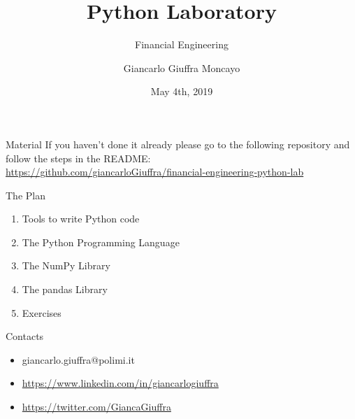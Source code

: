 \documentclass{beamer}
\title{Python Laboratory}
\subtitle{Financial Engineering}
\date{May 4th, 2019}
\author{Giancarlo Giuffra Moncayo}
\institute{Politecnico di Milano}
\begin{document}
  \maketitle

  \begin{frame}{Material}
   If you haven't done it already please go to the following repository and follow the steps in the README:\\
   \vspace{1cm}
   \footnotesize{\url{https://github.com/giancarloGiuffra/financial-engineering-python-lab}}
  \end{frame}
  
  \begin{frame}{The Plan}
   \begin{enumerate}
   \item<1-> Tools to write Python code
   \item<2-> The Python Programming Language
   \item<3-> The NumPy Library
   \item<4-> The pandas Library
   \item<5-> Exercises
   \end{enumerate}
  \end{frame}
  
  \begin{frame}{Contacts}
   \begin{itemize}
   \item[\faEnvelope] giancarlo.giuffra@polimi.it
   \item[\faLinkedin] \url{https://www.linkedin.com/in/giancarlogiuffra}
   \item[\faTwitter] \url{https://twitter.com/GiancaGiuffra}
   \end{itemize}
  \end{frame}
  
\end{document}
